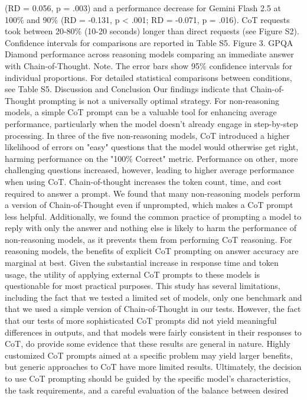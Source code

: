 (RD = 0.056, p = .003) and a performance decrease for Gemini Flash 2.5 at 100\% and 90\% (RD
= -0.131, p < .001; RD = -0.071, p = .016). CoT requests took between 20-80\% (10-20 seconds)
longer than direct requests (see Figure S2). Confidence intervals for comparisons are reported
in Table S5.
Figure 3. GPQA Diamond performance across reasoning models comparing an immediate
answer with Chain-of-Thought.
Note. The error bars show 95\% confidence intervals for individual proportions. For detailed
statistical comparisons between conditions, see Table S5.
Discussion and Conclusion
Our findings indicate that Chain-of-Thought prompting is not a universally optimal strategy.
For non-reasoning models, a simple CoT prompt can be a valuable tool for enhancing average
performance, particularly when the model doesn't already engage in step-by-step processing. In
three of the five non-reasoning models, CoT introduced a higher likelihood of errors on "easy"
questions that the model would otherwise get right, harming performance on the "100\% Correct"
metric. Performance on other, more challenging questions increased, however, leading to higher
average performance when using CoT. Chain-of-thought increases the token count, time, and
cost required to answer a prompt.
We found that many non-reasoning models perform a version of Chain-of-Thought even if
unprompted, which makes a CoT prompt less helpful. Additionally, we found the common
practice of prompting a model to reply with only the answer and nothing else is likely to harm the
performance of non-reasoning models, as it prevents them from performing CoT reasoning.
For reasoning models, the benefits of explicit CoT prompting on answer accuracy are marginal
at best. Given the substantial increase in response time and token usage, the utility of applying
external CoT prompts to these models is questionable for most practical purposes.
This study has several limitations, including the fact that we tested a limited set of models, only
one benchmark and that we used a simple version of Chain-of-Thought in our tests. However,
the fact that our tests of more sophisticated CoT prompts did not yield meaningful differences in
outputs, and that models were fairly consistent in their responses to CoT, do provide some
evidence that these results are general in nature. Highly customized CoT prompts aimed at a
specific problem may yield larger benefits, but generic approaches to CoT have more limited
results. Ultimately, the decision to use CoT prompting should be guided by the specific model's
characteristics, the task requirements, and a careful evaluation of the balance between desired
